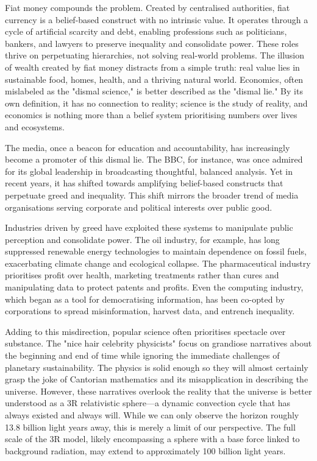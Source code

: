 \documentclass[12pt]{article}
\begin{document}
Fiat money compounds the problem. Created by centralised authorities, fiat currency is a belief-based construct with no intrinsic value. It operates through a cycle of artificial scarcity and debt, enabling professions such as politicians, bankers, and lawyers to preserve inequality and consolidate power. These roles thrive on perpetuating hierarchies, not solving real-world problems. The illusion of wealth created by fiat money distracts from a simple truth: real value lies in sustainable food, homes, health, and a thriving natural world. Economics, often mislabeled as the "dismal science," is better described as the "dismal lie." By its own definition, it has no connection to reality; science is the study of reality, and economics is nothing more than a belief system prioritising numbers over lives and ecosystems.

The media, once a beacon for education and accountability, has increasingly become a promoter of this dismal lie. The BBC, for instance, was once admired for its global leadership in broadcasting thoughtful, balanced analysis. Yet in recent years, it has shifted towards amplifying belief-based constructs that perpetuate greed and inequality. This shift mirrors the broader trend of media organisations serving corporate and political interests over public good.

Industries driven by greed have exploited these systems to manipulate public perception and consolidate power. The oil industry, for example, has long suppressed renewable energy technologies to maintain dependence on fossil fuels, exacerbating climate change and ecological collapse. The pharmaceutical industry prioritises profit over health, marketing treatments rather than cures and manipulating data to protect patents and profits. Even the computing industry, which began as a tool for democratising information, has been co-opted by corporations to spread misinformation, harvest data, and entrench inequality.

Adding to this misdirection, popular science often prioritises spectacle over substance. The "nice hair celebrity physicists" focus on grandiose narratives about the beginning and end of time while ignoring the immediate challenges of planetary sustainability. The physics is solid enough so they will almost certainly grasp the joke of Cantorian mathematics and its misapplication in describing the universe. However, these narratives overlook the reality that the universe is better understood as a 3R relativistic sphere—a dynamic convection cycle that has always existed and always will. While we can only observe the horizon roughly 13.8 billion light years away, this is merely a limit of our perspective. The full scale of the 3R model, likely encompassing a sphere with a base force linked to background radiation, may extend to approximately 100 billion light years. 
\end{document}
